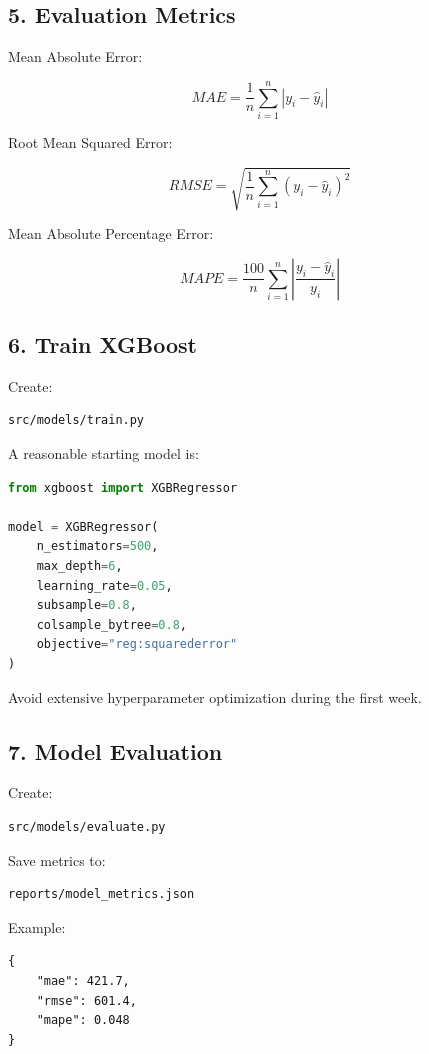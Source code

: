 \documentclass[11pt,a4paper]{article}
\begin{document}
\subsection{5. Evaluation Metrics}

Mean Absolute Error:

\[
MAE =
\frac{1}{n}
\sum_{i=1}^{n}
|y_i-\hat{y}_i|
\]

Root Mean Squared Error:

\[
RMSE =
\sqrt{
\frac{1}{n}
\sum_{i=1}^{n}
(y_i-\hat{y}_i)^2
}
\]

Mean Absolute Percentage Error:

\[
MAPE =
\frac{100}{n}
\sum_{i=1}^{n}
\left|
\frac{y_i-\hat{y}_i}{y_i}
\right|
\]

\subsection{6. Train XGBoost}

Create:

\begin{lstlisting}
src/models/train.py
\end{lstlisting}

A reasonable starting model is:

\begin{lstlisting}[language=Python]
from xgboost import XGBRegressor

model = XGBRegressor(
    n_estimators=500,
    max_depth=6,
    learning_rate=0.05,
    subsample=0.8,
    colsample_bytree=0.8,
    objective="reg:squarederror"
)
\end{lstlisting}

Avoid extensive hyperparameter optimization during the first week.

\subsection{7. Model Evaluation}

Create:

\begin{lstlisting}
src/models/evaluate.py
\end{lstlisting}

Save metrics to:

\begin{lstlisting}
reports/model_metrics.json
\end{lstlisting}

Example:

\begin{lstlisting}
{
    "mae": 421.7,
    "rmse": 601.4,
    "mape": 0.048
}
\end{lstlisting}
\end{document}
